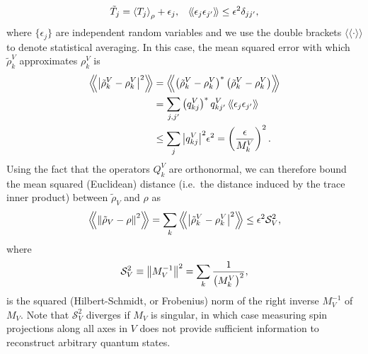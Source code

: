 \documentclass[notitlepage,twocolumn]{revtex4-2}
\newcommand{\f}[2]{\dfrac{#1}{#2}} %
\newcommand{\p}[1]{\left(#1\right)} %
\newcommand{\bk}{\Braket} %
\renewcommand{\set}[1]{\{#1\}} %
\newcommand{\bbk}[1]{\langle\!\langle #1 \rangle\!\rangle}
\newcommand{\Bbk}[1]
{\left\langle\!\!\left\langle #1 \right\rangle\!\!\right\rangle}
\renewcommand{\S}{\mathcal{S}}
\begin{document}
\begin{align}
  \tilde T_j = \bk{T_j}_\rho + \epsilon_j,
  &&
  \bbk{\epsilon_j \epsilon_{j'}} \le \epsilon^2 \delta_{jj'},
  \label{eq:error_assumption}
\end{align}
where $\set{\epsilon_j}$ are independent random variables and we use the double brackets $\bbk{\cdot}$ to denote statistical averaging.
In this case, the mean squared error with which $\tilde\rho^V_k$ approximates $\rho^V_k$ is
\begin{align}
  \Bbk{\abs{\tilde\rho^V_k-\rho^V_k}^2}
  &= \Bbk{\p{\tilde\rho^V_k-\rho^V_k}^*\p{\tilde\rho^V_k-\rho^V_k}} \\
  &= \sum_{j,j'} \p{q^V_{kj}}^* q^V_{kj'}\,
  \bbk{\epsilon_j \epsilon_{j'}} \\
  &\le \sum_j \abs{q^V_{kj}}^2 \epsilon^2
  = \p{\f{\epsilon}{M^V_k}}^2.
\end{align}
Using the fact that the operators $Q^V_k$ are orthonormal, we can therefore bound the mean squared (Euclidean) distance (i.e.~the distance induced by the trace inner product) between $\tilde\rho_V$ and $\rho$ as
\begin{align}
  \Bbk{\norm{\tilde\rho_V-\rho}^2}
  = \sum_k \Bbk{\abs{\tilde\rho^V_k - \rho^V_k}^2}
  \le \epsilon^2 \S_V^2,
  \label{eq:bound_eps}
\end{align}
where
\begin{align}
  \S_V^2 \equiv \norm{M_V^{-1}}^2 = \sum_k\f1{\p{M^V_k}^2},
\end{align}
is the squared (Hilbert-Schmidt, or Frobenius) norm of the right inverse $M_V^{-1}$ of $M_V$.
Note that $\S_V^2$ diverges if $M_V$ is singular, in which case measuring spin projections along all axes in $V$ does not provide sufficient information to reconstruct arbitrary quantum states.
\end{document}
